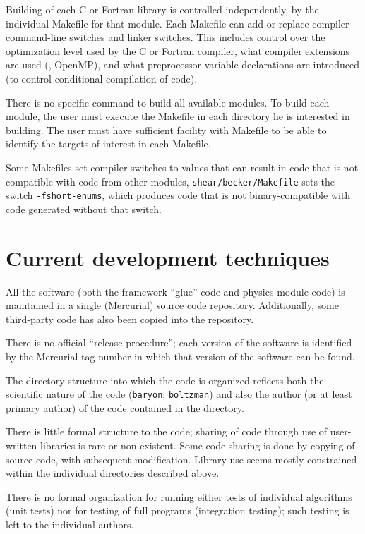 \documentclass[draftmode,draftwater]{memarticle}
\newcommand{\prog}[1]%
  {\texttt{#1}}
\newcommand{\despipe}{\name{des-pipe}\xspace}
\begin{document}
Building of each C or Fortran library is controlled independently, by
the individual Makefile for that module. Each Makefile can add or
replace compiler command-line switches and linker switches. This
includes control over the optimization level used by the C or Fortran
compiler, what compiler extensions are used (\eg, OpenMP), and what
preprocessor variable declarations are introduced (to control
conditional compilation of code).

There is no specific command to build all available modules. To build
each module, the user must execute the Makefile in each directory he is
interested in building. The user must have sufficient facility with
Makefile to be able to identify the targets of interest in each
Makefile.

Some Makefiles set compiler switches to values that can result in code
that is not compatible with code from other modules, \eg
\prog{shear/becker/Makefile} sets the switch \texttt{-fshort-enums},
which produces code that is not binary-compatible with code generated
without that switch.

\section{Current development techniques}

All the \despipe software (both the framework ``glue'' code and
physics module code) is maintained in a single (Mercurial) source code
repository. Additionally, some third-party code has also been copied
into the \despipe repository.

There is no official ``release procedure''; each version of the software
is identified by the Mercurial tag number in which that version of the
software can be found.

The directory structure into which the code is organized reflects both
the scientific nature of the code (\eg \prog{baryon}, \prog{boltzman})
and also the author (or at least primary author) of the code contained
in the directory.

There is little formal structure to the code; sharing of code through
use of user-written libraries is rare or non-existent. Some code sharing
is done by copying of source code, with subsequent modification. Library
use seems mostly constrained within the individual directories described
above.

There is no formal organization for running either tests of individual
algorithms (unit tests) nor for testing of full programs (integration
testing); such testing is left to the individual authors.
\end{document}
